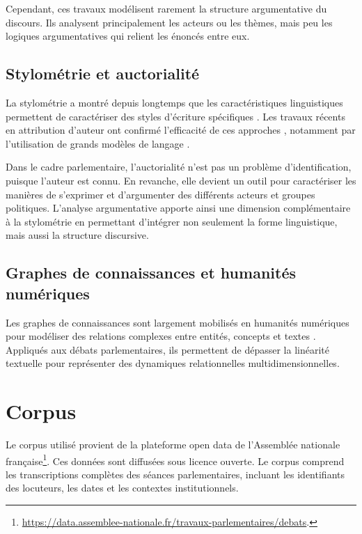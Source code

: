 \documentclass[final, fra]{anthology-ch}      %
\begin{document}
Cependant, ces travaux modélisent rarement la structure argumentative du discours. Ils analysent principalement les acteurs ou les thèmes, mais peu les logiques argumentatives qui relient les énoncés entre eux.

\subsection{Stylométrie et auctorialité}

La stylométrie a montré depuis longtemps que les caractéristiques linguistiques permettent de caractériser des styles d’écriture spécifiques \cite{juola2008, stamatatos2009survey, kestemont2014}. Les travaux récents en attribution d’auteur ont confirmé l’efficacité de ces approches \cite{segarra2015, bjorklund2017syntactic}, notamment par l'utilisation de grands modèles de langage \cite{huang2025authorship}.

Dans le cadre parlementaire, l’auctorialité n’est pas un problème d’identification, puisque l’auteur est connu. En revanche, elle devient un outil pour caractériser les manières de s’exprimer et d’argumenter des différents acteurs et groupes politiques. L’analyse argumentative apporte ainsi une dimension complémentaire à la stylométrie en permettant d’intégrer non seulement la forme linguistique, mais aussi la structure discursive.

\subsection{Graphes de connaissances et humanités numériques}

Les graphes de connaissances sont largement mobilisés en humanités numériques pour modéliser des relations complexes entre entités, concepts et textes \cite{haslhofer18}. Appliqués aux débats parlementaires, ils permettent de dépasser la linéarité textuelle pour représenter des dynamiques relationnelles multidimensionnelles.

\section{Corpus}

Le corpus utilisé provient de la plateforme open data de l’Assemblée nationale française\footnote{\url{https://data.assemblee-nationale.fr/travaux-parlementaires/debats}.}. Ces données sont diffusées sous licence ouverte. Le corpus comprend les transcriptions complètes des séances parlementaires, incluant les identifiants des locuteurs, les dates et les contextes institutionnels.
\end{document}
